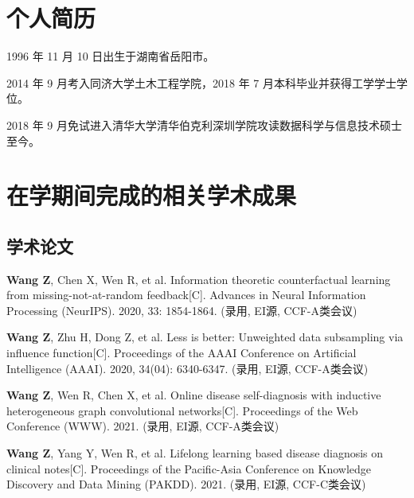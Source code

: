 
\begin{resume}

  \section*{个人简历}

  1996 年 11 月 10 日出生于湖南省岳阳市。

  2014 年 9 月考入同济大学土木工程学院，2018 年 7 月本科毕业并获得工学学士学位。

  2018 年 9 月免试进入清华大学清华伯克利深圳学院攻读数据科学与信息技术硕士至今。


  \section*{在学期间完成的相关学术成果}

  \subsection*{学术论文}

  \begin{achievements}
    \item \textbf{Wang Z}, Chen X, Wen R, et al. Information theoretic counterfactual learning from missing-not-at-random feedback[C]. Advances in Neural Information Processing (NeurIPS). 2020, 33: 1854-1864. (录用, EI源, CCF-A类会议)
    \item \textbf{Wang Z}, Zhu H, Dong Z, et al. Less is better: Unweighted data subsampling via influence function[C]. Proceedings of the AAAI Conference on Artificial Intelligence (AAAI). 2020, 34(04): 6340-6347. (录用, EI源, CCF-A类会议)
    \item \textbf{Wang Z}, Wen R, Chen X, et al. Online disease self-diagnosis with inductive heterogeneous graph convolutional networks[C]. Proceedings of the Web Conference (WWW). 2021. (录用, EI源, CCF-A类会议)
    \item \textbf{Wang Z}, Yang Y, Wen R, et al. Lifelong learning based disease diagnosis on clinical notes[C]. Proceedings of the Pacific-Asia Conference on Knowledge Discovery and Data Mining (PAKDD). 2021. (录用, EI源, CCF-C类会议)
  \end{achievements}




\end{resume}
